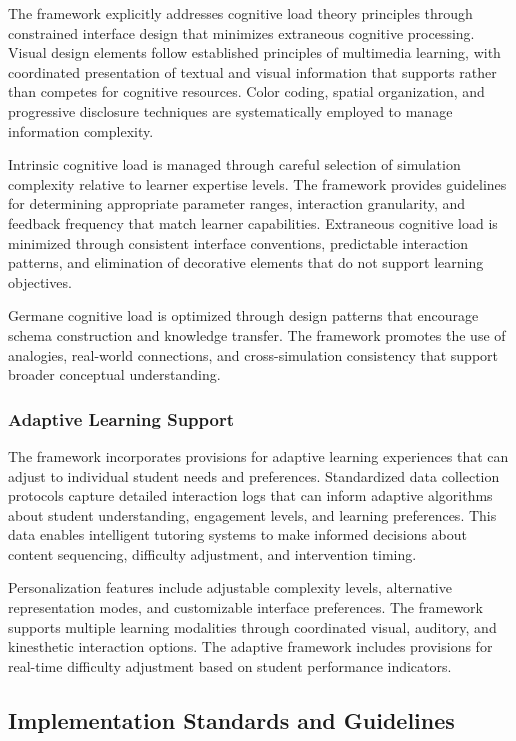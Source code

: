 The framework explicitly addresses cognitive load theory principles through constrained interface design that minimizes extraneous cognitive processing. Visual design elements follow established principles of multimedia learning, with coordinated presentation of textual and visual information that supports rather than competes for cognitive resources. Color coding, spatial organization, and progressive disclosure techniques are systematically employed to manage information complexity.

Intrinsic cognitive load is managed through careful selection of simulation complexity relative to learner expertise levels. The framework provides guidelines for determining appropriate parameter ranges, interaction granularity, and feedback frequency that match learner capabilities. Extraneous cognitive load is minimized through consistent interface conventions, predictable interaction patterns, and elimination of decorative elements that do not support learning objectives.

Germane cognitive load is optimized through design patterns that encourage schema construction and knowledge transfer. The framework promotes the use of analogies, real-world connections, and cross-simulation consistency that support broader conceptual understanding.

\subsubsection{Adaptive Learning Support}

The framework incorporates provisions for adaptive learning experiences that can adjust to individual student needs and preferences. Standardized data collection protocols capture detailed interaction logs that can inform adaptive algorithms about student understanding, engagement levels, and learning preferences. This data enables intelligent tutoring systems to make informed decisions about content sequencing, difficulty adjustment, and intervention timing.

Personalization features include adjustable complexity levels, alternative representation modes, and customizable interface preferences. The framework supports multiple learning modalities through coordinated visual, auditory, and kinesthetic interaction options. The adaptive framework includes provisions for real-time difficulty adjustment based on student performance indicators.

\subsection{Implementation Standards and Guidelines}


